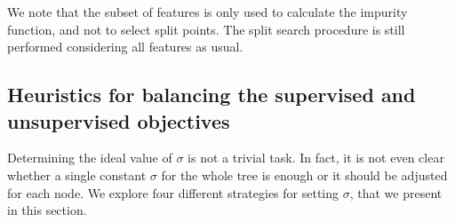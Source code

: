 We note that the subset of features is only used to calculate the impurity function, and not to select split points. The split search procedure is still performed considering all features as usual.



\subsection{Heuristics for balancing the supervised and unsupervised objectives}
\label{sec:sigma heuristics}

Determining the ideal value of $\sigma$ is not a trivial task. In fact, it is not even clear whether a single constant $\sigma$ for the whole tree is enough or it should be adjusted for each node. We explore four different strategies for setting $\sigma$, that we present in this section.



